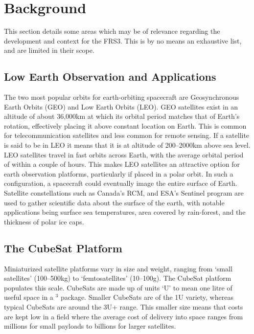 \documentclass[12pt, twoside]{report}
\begin{document}
\chapter{Background}
This section details some areas which may be of relevance regarding the development and context for the FRS3. This is by no means an exhaustive list, and are limited in their scope.

\section{Low Earth Observation and Applications}
\par The two most popular orbits for earth-orbiting spacecraft are Geosynchronous Earth Orbits (GEO) and Low Earth Orbits (LEO).
GEO satellites exist in an altitude of about 36,000km at which its orbital period matches that of Earth's rotation, effectively placing it above constant location on Earth.
This is common for telecommunication satellites and less common for remote sensing.
If a satellite is said to be in LEO it means that it is at altitude of 200–2000km above sea level.
LEO satellites travel in fast orbits across Earth, with the average orbital period of within a couple of hours.
This makes LEO satellites an attractive option for earth observation platforms, particularly if placed in a polar orbit.
In such a configuration, a spacecraft could eventually image the entire surface of Earth.
Satellite constellations such as Canada's RCM, and ESA's Sentinel program are used to gather scientific data about the surface of the earth, with notable applications being surface sea temperatures, area covered by rain-forest, and the thickness of polar ice caps.


\section{The CubeSat Platform}
\par Miniaturized satellite platforms vary in size and weight, ranging from `small satellites' (100–500kg) to `femtosatellites' (10–100g).
The CubeSat platform populates this scale.
CubeSats are made up of units `U' to mean one litre of useful space in a $^3$ package.
Smaller CubeSats are of the 1U variety, whereas typical CubeSats are around the 3U+ range.
This smaller size means that costs are kept low in a field where the average cost of delivery into space ranges from millions for small payloads to billions for larger satellites.
\end{document}

